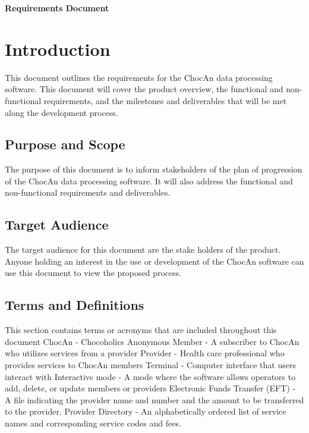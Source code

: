 \documentclass{article}
\renewcommand{\maketitle}{
   \begin{center}
      {\Huge \bfseries Requirements Document}
   \end{center}
}
\begin{document}
\maketitle
\tableofcontents

\section{Introduction}
This document outlines the requirements for the ChocAn data processing software. This document will cover the product overview, the functional and non-functional requirements, and the milestones and deliverables that will be met along the development process.

\subsection{Purpose and Scope}
The purpose of this document is to inform stakeholders of the plan of progression of the ChocAn data processing software. It will also address the functional and non-functional requirements and deliverables.

\subsection{Target Audience}
The target audience for this document are the stake holders of the product. Anyone holding an interest in the use or development of the ChocAn software can use this document to view the proposed process.

\subsection{Terms and Definitions}
This section contains terms or acronyms that are included throughout this document
ChocAn - Chocoholics Anonymous
Member - A subscriber to ChocAn who utilizes services from a provider
Provider - Health care professional who provides services to ChocAn members
Terminal - Computer interface that users interact with
Interactive mode - A mode where the software allows operators to add, delete, or update members or providers
Electronic Funds Transfer (EFT) - A file indicating the provider name and number and the amount to be transferred to the provider.
Provider Directory - An alphabetically ordered list of service names and corresponding service codes and fees.
\end{document}
